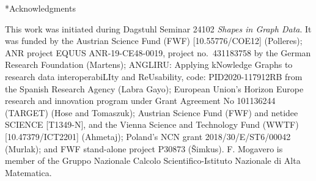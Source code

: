 

\begin{section}*{Acknowledgments}

This work was initiated during Dagstuhl Seminar 24102 \emph{Shapes in Graph
Data}.
It was funded by the Austrian Science Fund (FWF) [10.55776/COE12] (Polleres);
ANR project EQUUS ANR-19-CE48-0019, project no.~431183758 by the German Research Foundation (Martens);
ANGLIRU: Applying kNowledge Graphs to research data interoperabiLIty and
ReUsability, code: PID2020-117912RB from the Spanish Research Agency (Labra
Gayo);
European Union's Horizon Europe research and innovation program under Grant
Agreement No 101136244 (TARGET) (Hose and Tomaszuk);
Austrian Science Fund (FWF) and netidee SCIENCE [T1349-N], and the Vienna
Science and Technology Fund (WWTF) [10.47379/ICT2201] (Ahmetaj);
Poland's NCN grant 2018/30/E/ST6/00042 (Murlak);
and FWF stand-alone project P30873 (\v{S}imkus).
F. Mogavero is member of the Gruppo Nazionale Calcolo Scientifico-Istituto
Nazionale di Alta Matematica.

\end{section}

